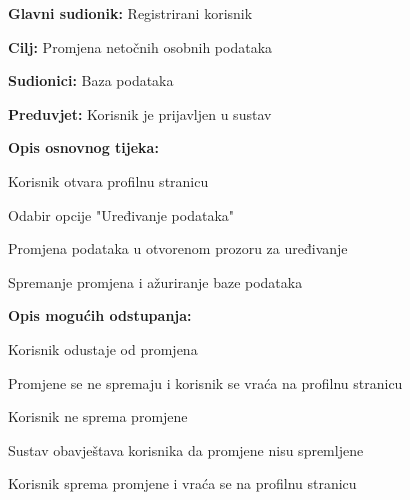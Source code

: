 				\noindent {}
				\begin{packed_item}
					
					\item \textbf{Glavni sudionik: }Registrirani korisnik
					\item  \textbf{Cilj:} Promjena netočnih osobnih podataka
					\item  \textbf{Sudionici:} Baza podataka
					\item  \textbf{Preduvjet:} Korisnik je prijavljen u sustav
					\item  \textbf{Opis osnovnog tijeka:}
					
					\item[] \begin{packed_enum}
						
						\item Korisnik otvara profilnu stranicu
						\item Odabir opcije "Uređivanje podataka"
						\item Promjena podataka u otvorenom prozoru za uređivanje
						\item Spremanje promjena i ažuriranje baze podataka
					\end{packed_enum}
					
					\item  \textbf{Opis mogućih odstupanja:}
					
					\item[] \begin{packed_item}
						
						\item[4.a] Korisnik odustaje od promjena
						\item[] \begin{packed_enum}
							
							\item Promjene se ne spremaju i korisnik se vraća na profilnu stranicu
							
						\end{packed_enum}	
						\item[4.b] Korisnik ne sprema promjene
						\item[] \begin{packed_enum}
							
							\item Sustav obavještava korisnika da promjene nisu spremljene
							\item Korisnik sprema promjene i vraća se na profilnu stranicu
						\end{packed_enum}	
						
					\end{packed_item}
				\end{packed_item}
				

